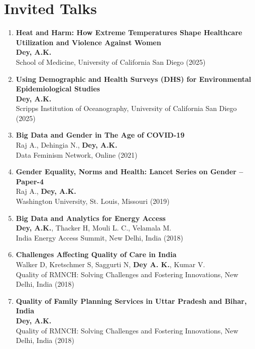 \documentclass[13pt,letterpaper]{article}
\begin{document}
\section*{Invited Talks}
\label{sec:orgfd31132}

\begin{enumerate}
\item \textbf{Heat and Harm: How Extreme Temperatures Shape Healthcare Utilization and Violence Against Women}\\
\textbf{Dey, A.K.}\\
School of Medicine, University of California San Diego (2025) 

\item \textbf{Using Demographic and Health Surveys (DHS) for Environmental Epidemiological Studies}\\
\textbf{Dey, A.K.}\\
Scripps Institution of Oceanography, University of California San Diego (2025) 

\item \textbf{Big Data and Gender in The Age of COVID-19}\\
Raj A., Dehingia N., \textbf{Dey, A.K.}\\
Data Feminism Network, Online (2021) 

\item \textbf{Gender Equality, Norms and Health: Lancet Series on Gender – Paper-4}\\
Raj A., \textbf{Dey, A.K.}\\
Washington University, St. Louis, Missouri (2019) 

\item \textbf{Big Data and Analytics for Energy Access}\\
\textbf{Dey, A.K.}, Thacker H, Mouli L. C., Velamala M.\\
India Energy Access Summit, New Delhi, India (2018) 

\item \textbf{Challenges Affecting Quality of Care in India}\\
Walker D, Kretschmer S, Saggurti N, \textbf{Dey A. K.}, Kumar V.\\
Quality of RMNCH: Solving Challenges and Fostering Innovations, New Delhi, India (2018)  

\item \textbf{Quality of Family Planning Services in Uttar Pradesh and Bihar, India}\\
\textbf{Dey, A.K.}\\
Quality of RMNCH: Solving Challenges and Fostering Innovations, New Delhi, India (2018) 


\end{enumerate}
\end{document}
